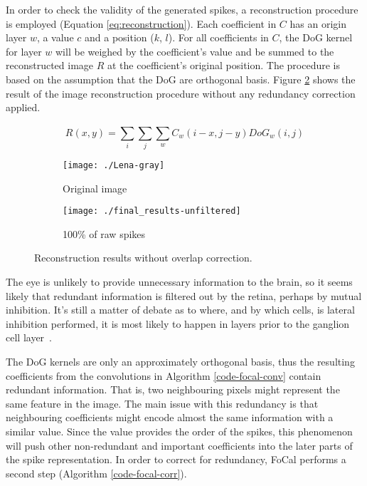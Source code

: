 In order to check the validity of the generated spikes, a reconstruction procedure is employed (Equation \ref{eq:reconstruction}). Each coefficient in $C$ has an origin layer $w$, a value $c$ and a position ($k$, $l$). For all coefficients in $C$, the DoG kernel for layer $w$ will be weighed by the coefficient's value and be summed to the reconstructed image  $R$ at the coefficient's original position. The procedure is based on the assumption that the DoG are orthogonal basis. Figure \ref{pic-unfiltered-spikes} shows the result of the image reconstruction procedure without any redundancy correction applied.

\begin{equation}
  R(x,y) = \sum_{i}^{} \sum_{j}^{} \sum_{w}^{} C_{w}(i - x, j - y)DoG_{w}(i, j)
  \label{eq:reconstruction}
\end{equation}

\begin{figure}[hbt]
  \centering
  \begin{subfigure}[t]{0.3\textwidth}
    \centering
    \captionsetup{justification=centering,margin=0.1cm}
    \texttt{[image: ./Lena-gray]}
    \caption{Original image}
  \end{subfigure}
  \begin{subfigure}[t]{0.3\textwidth}
    \centering
    \captionsetup{justification=centering,margin=0.1cm}
    \texttt{[image: ./final\_results-unfiltered]}
    \caption{100\% of raw spikes}
    \label{pic-unfiltered-spikes}
  \end{subfigure}
  \caption{Reconstruction results without overlap correction.}
\end{figure}

The eye is unlikely to provide unnecessary information to the brain, so it seems likely that redundant information is filtered out by the retina, perhaps by mutual inhibition.
It's still a matter of debate as to where, and by which cells, is lateral inhibition performed, it is most likely to happen in layers prior to the ganglion cell layer~\cite{eye-brain-vision-hubel1995}. 

The DoG kernels are only an approximately orthogonal basis, thus the resulting coefficients from the convolutions in Algorithm \ref{code-focal-conv} contain redundant information. That is, two neighbouring pixels might represent the same feature in the image. The main issue with this redundancy is that neighbouring coefficients might encode almost the same information with a similar value. Since the value provides the order of the spikes, this phenomenon will push other non-redundant and important coefficients into the later parts of the spike representation. In order to correct for redundancy, FoCal performs a second step (Algorithm \ref{code-focal-corr}).

